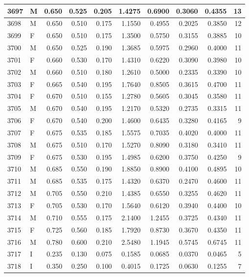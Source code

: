 \documentclass[9pt,twocolumn,twoside,]{pnas-new}
\begin{document}
\begin{tabular}{l|l|r|r|r|r|r|r|r|r}
\hline
3697 & M & 0.650 & 0.525 & 0.205 & 1.4275 & 0.6900 & 0.3060 & 0.4355 & 13\\
\hline
3698 & M & 0.650 & 0.510 & 0.175 & 1.1550 & 0.4955 & 0.2025 & 0.3850 & 12\\
\hline
3699 & F & 0.650 & 0.510 & 0.175 & 1.3500 & 0.5750 & 0.3155 & 0.3885 & 10\\
\hline
3700 & M & 0.650 & 0.525 & 0.190 & 1.3685 & 0.5975 & 0.2960 & 0.4000 & 11\\
\hline
3701 & F & 0.660 & 0.530 & 0.170 & 1.4310 & 0.6220 & 0.3090 & 0.3980 & 10\\
\hline
3702 & M & 0.660 & 0.510 & 0.180 & 1.2610 & 0.5000 & 0.2335 & 0.3390 & 10\\
\hline
3703 & F & 0.665 & 0.540 & 0.195 & 1.7640 & 0.8505 & 0.3615 & 0.4700 & 11\\
\hline
3704 & F & 0.670 & 0.510 & 0.155 & 1.2780 & 0.5605 & 0.3045 & 0.3580 & 11\\
\hline
3705 & M & 0.670 & 0.540 & 0.195 & 1.2170 & 0.5320 & 0.2735 & 0.3315 & 11\\
\hline
3706 & F & 0.670 & 0.540 & 0.200 & 1.4600 & 0.6435 & 0.3280 & 0.4165 & 9\\
\hline
3707 & F & 0.675 & 0.535 & 0.185 & 1.5575 & 0.7035 & 0.4020 & 0.4000 & 11\\
\hline
3708 & M & 0.675 & 0.510 & 0.170 & 1.5270 & 0.8090 & 0.3180 & 0.3410 & 11\\
\hline
3709 & F & 0.675 & 0.530 & 0.195 & 1.4985 & 0.6200 & 0.3750 & 0.4250 & 9\\
\hline
3710 & M & 0.685 & 0.550 & 0.190 & 1.8850 & 0.8900 & 0.4100 & 0.4895 & 10\\
\hline
3711 & M & 0.685 & 0.535 & 0.175 & 1.4320 & 0.6370 & 0.2470 & 0.4600 & 11\\
\hline
3712 & M & 0.705 & 0.550 & 0.210 & 1.4385 & 0.6550 & 0.3255 & 0.4620 & 11\\
\hline
3713 & F & 0.705 & 0.530 & 0.170 & 1.5640 & 0.6120 & 0.3940 & 0.4400 & 10\\
\hline
3714 & M & 0.710 & 0.555 & 0.175 & 2.1400 & 1.2455 & 0.3725 & 0.4340 & 11\\
\hline
3715 & F & 0.725 & 0.560 & 0.185 & 1.7920 & 0.8730 & 0.3670 & 0.4350 & 11\\
\hline
3716 & M & 0.780 & 0.600 & 0.210 & 2.5480 & 1.1945 & 0.5745 & 0.6745 & 11\\
\hline
3717 & I & 0.235 & 0.130 & 0.075 & 0.1585 & 0.0685 & 0.0370 & 0.0465 & 5\\
\hline
3718 & I & 0.350 & 0.250 & 0.100 & 0.4015 & 0.1725 & 0.0630 & 0.1255 & 7\\

\end{tabular}
\end{document}
